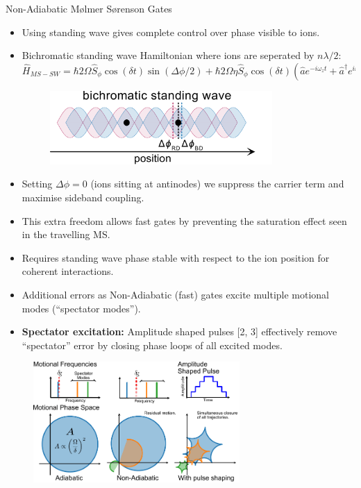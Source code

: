 \documentclass[final]{beamer}
\begin{document}
\begin{frame}{}
\begin{center}
\begin{columns}[t]
\begin{column}{0.49\textwidth}
\begin{alertblock}{Non-Adiabatic Mølmer Sørenson Gates}

     \vspace*{-3.5em}
      \begin{itemize}
      \item Using standing wave gives complete control over phase
        visible to ions.
      \item Bichromatic standing wave Hamiltonian where ions are
        seperated by $n\lambda/2$:
      \large$$ \hat{H}_{MS-SW} = \hbar 2\Omega \hat{S}_{\phi}\cos{(\delta t)}\sin{(\Delta\phi/2)} + \hbar 2\Omega\eta \hat{S}_\phi\cos{(\delta t)}(\hat{a}e^{-i\omega_zt} + \hat{a}^\dagger e^{i\omega_zt})\cos{(\Delta\phi/2)}$$\normalsize
      \begin{figure}
        \includegraphics[width=0.8\textwidth]{./figs/bichro.pdf}
      \end{figure}
      \item Setting $\Delta\phi = 0$ (ions sitting at antinodes) we
        suppress the carrier term and maximise sideband
        coupling.
      \item This extra freedom allows fast gates by preventing the
        saturation effect seen in the travelling MS.
      \item Requires standing wave phase stable with respect to the ion position for 
            coherent interactions.\\

      \item Additional errors as Non-Adiabatic (fast) gates excite multiple motional modes (``spectator modes''). 
      \item \textbf{Spectator excitation:} Amplitude shaped pulses
        [2, 3] effectively remove ``spectator'' error by closing
        phase loops of all excited modes.
      \end{itemize}
      \begin{figure}
        \includegraphics[width=0.7\textwidth]{./figs/phase_loops_fig_bumpy.pdf}
      \end{figure}
    \end{alertblock}


\end{column}
\end{columns}
\end{center}
\end{frame}
\end{document}
